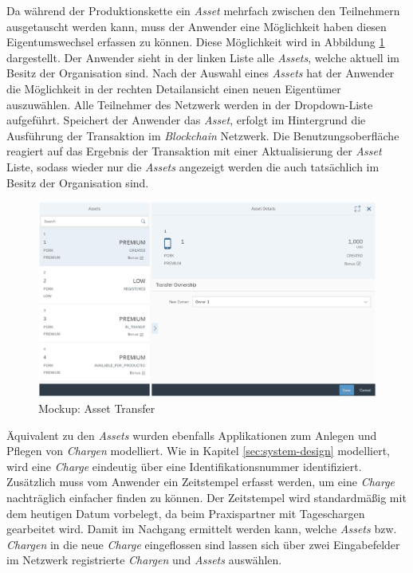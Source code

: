 Da während der Produktionskette ein \textit{Asset} mehrfach zwischen den Teilnehmern ausgetauscht werden kann, muss der Anwender eine Möglichkeit haben diesen Eigentumswechsel erfassen zu können. Diese Möglichkeit wird in Abbildung \ref{fig:ui-transfer-asset} dargestellt. Der Anwender sieht in der linken Liste alle \textit{Assets}, welche aktuell im Besitz der Organisation sind. Nach der Auswahl eines \textit{Assets} hat der Anwender die Möglichkeit in der rechten Detailansicht einen neuen Eigentümer auszuwählen. Alle Teilnehmer des Netzwerk werden in der Dropdown-Liste aufgeführt. Speichert der Anwender das \textit{Asset}, erfolgt im Hintergrund die Ausführung der Transaktion im \textit{Blockchain} Netzwerk. Die Benutzungsoberfläche reagiert auf das Ergebnis der Transaktion mit einer Aktualisierung der \textit{Asset} Liste, sodass wieder nur die \textit{Assets} angezeigt werden die auch tatsächlich im Besitz der Organisation sind.

\begin{figure}[H]
	\centering
	\includegraphics[width=1\linewidth]{pictures/ui-transfer-asset}
	\caption[Mockup: Asset Transfer]{Mockup: Asset Transfer}
	\label{fig:ui-transfer-asset}
\end{figure}

Äquivalent zu den \textit{Assets} wurden ebenfalls Applikationen zum Anlegen und Pflegen von \textit{Chargen} modelliert. Wie in Kapitel \ref{sec:system-design} modelliert, wird eine \textit{Charge} eindeutig über eine Identifikationsnummer identifiziert. Zusätzlich muss vom Anwender ein Zeitstempel erfasst werden, um eine \textit{Charge} nachträglich einfacher finden zu können. Der Zeitstempel wird standardmäßig mit dem heutigen Datum vorbelegt, da beim Praxispartner mit Tageschargen gearbeitet wird. Damit im Nachgang ermittelt werden kann, welche \textit{Assets} bzw. \textit{Chargen} in die neue \textit{Charge} eingeflossen sind lassen sich über zwei Eingabefelder im Netzwerk registrierte \textit{Chargen} und \textit{Assets} auswählen.

